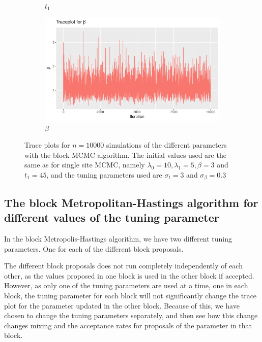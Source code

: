 \begin{figure}[h]
\begin{subfigure}[b]{0.49\textwidth}
        \caption{$t_1$}
        \label{fig:block_burnin_t}
    \end{subfigure}
    \begin{subfigure}[b]{0.49\textwidth}
        \centering
        \includegraphics[width = \textwidth]{Images/block_sim_beta.pdf}
        \caption{$\beta$}
        \label{fig:block_burnin_beta}
    \end{subfigure}
    \caption{Trace plots for $n = 10000$ simulations of the different parameters with the block MCMC algorithm. The initial values used are the same as for single site MCMC, namely $\lambda_0 = 10, \lambda_1 = 5, \beta = 3$ and $t_1 = 45$, and the tuning parameters used are $\sigma_t = 3$ and $\sigma_{\beta} = 0.3$}
    \label{fig:burnin_blockMH}
\end{figure}



\subsection{The block Metropolitan-Hastings algorithm for different values of the tuning parameter}




In the block Metropolis-Hastings algorithm, we have two different tuning parameters. One for each of the different block proposals. 



The different block proposals does not run completely independently of each other, as the values proposed in one block is used in the other block if accepted. However, as only one of the tuning parameters are used at a time, one in each block, the tuning parameter for each block will not significantly change the trace plot for the parameter updated in the other block. Because of this, we have chosen to change the tuning parameters separately, and then see how this change changes mixing and the acceptance rates for proposals of the parameter in that block. 


